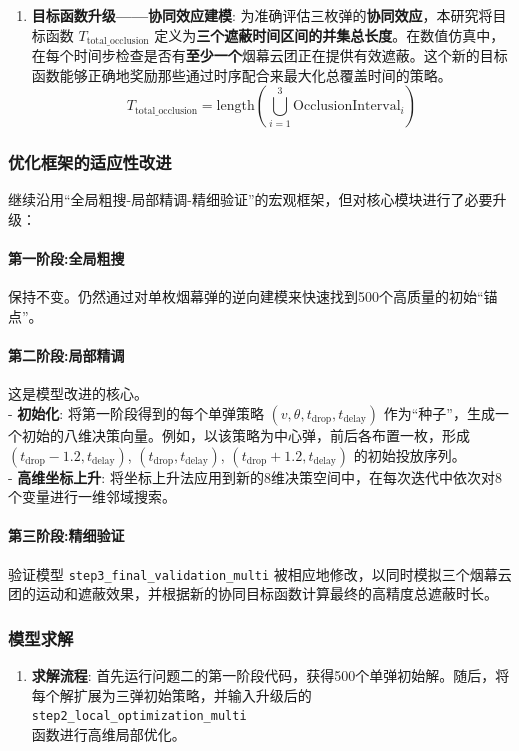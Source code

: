 \documentclass[12pt]{article}
\newcommand{\code}[1]{\texttt{#1}} %
\begin{document}
\begin{CJK}{UTF8}{gbsn}
\begin{enumerate}
			\item \textbf{目标函数升级——协同效应建模}:
			为准确评估三枚弹的\textbf{协同效应}，本研究将目标函数 $T_{\text{total\_occlusion}}$ 定义为\textbf{三个遮蔽时间区间的并集总长度}。在数值仿真中，在每个时间步检查是否有\textbf{至少一个}烟幕云团正在提供有效遮蔽。这个新的目标函数能够正确地奖励那些通过时序配合来最大化总覆盖时间的策略。
			\begin{equation}
				T_{\text{total\_occlusion}} = \text{length} \left( \bigcup_{i=1}^{3} \text{OcclusionInterval}_i \right)
			\end{equation}
			
		\end{enumerate}
		
		\subsubsection{优化框架的适应性改进}
		继续沿用“全局粗搜-局部精调-精细验证”的宏观框架，但对核心模块进行了必要升级：
		
		\paragraph{第一阶段:全局粗搜} 保持不变。仍然通过对单枚烟幕弹的逆向建模来快速找到500个高质量的初始“锚点”。
		
		\paragraph{第二阶段:局部精调} 这是模型改进的核心。\\
		\indent - \textbf{初始化}: 将第一阶段得到的每个单弹策略 $(v, \theta, t_{\text{drop}}, t_{\text{delay}})$ 作为“种子”，生成一个初始的八维决策向量。例如，以该策略为中心弹，前后各布置一枚，形成 $(t_{\text{drop}}-1.2, t_{\text{delay}})$, $(t_{\text{drop}}, t_{\text{delay}})$, $(t_{\text{drop}}+1.2, t_{\text{delay}})$ 的初始投放序列。\\
		\indent - \textbf{高维坐标上升}: 将坐标上升法应用到新的8维决策空间中，在每次迭代中依次对8个变量进行一维邻域搜索。
		
		\paragraph{第三阶段:精细验证} 验证模型 \code{step3\_final\_validation\_multi} 被相应地修改，以同时模拟三个烟幕云团的运动和遮蔽效果，并根据新的协同目标函数计算最终的高精度总遮蔽时长。
		
		
		\subsubsection{模型求解}
		\begin{enumerate}
			\item \textbf{求解流程}: 首先运行问题二的第一阶段代码，获得500个单弹初始解。随后，将每个解扩展为三弹初始策略，并输入升级后的\code{step2\_local\_optimization\_multi}\\函数进行高维局部优化。
			

\end{enumerate}
\end{CJK}
\end{document}
